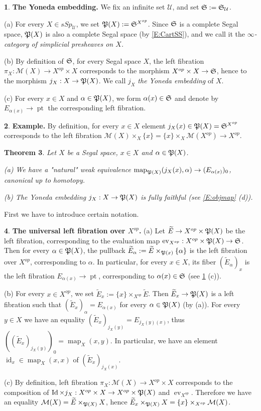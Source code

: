 \documentclass[12pt]{amsart}
\theoremstyle{plain}
\newtheorem{Thm}{Theorem}[subsection]
\theoremstyle{definition}
\newtheorem{Emp}[Thm]{}
\numberwithin{equation}{section}
\newcommand{\cal}[1]{\mathcal{#1}}
\newcommand{\C}[1]{\cal#1}
\newcommand{\wt}{\widetilde}
\newcommand{\al}{\alpha}
\newcommand{\re}[1]{\ref{E:#1}}
\newcommand{\id}{\operatorname{id}}
\newcommand{\ev}{\operatorname{ev}}
\newcommand{\map}{\operatorname{map}}
\newcommand{\pt}{\operatorname{pt}}
\newcommand{\Id}{\operatorname{Id}}
\renewcommand{\S}{\frak{S}}
\renewcommand{\P}{\frak{P}}
\begin{document}
\begin{Emp} \label{E:yoneda}
{\bf The Yoneda embedding.} We fix an infinite set $\C{U}$, and set
$\S:=\S_{\C{U}}$.

(a) For every $X\in sSp_{\C{U}}$, we set $\P(X):=\S^{X^{op}}$.
Since $\S$ is a complete Segal space, $\P(X)$ is also a complete
Segal space (by \re{CartSS}), and we call it the {\em
$\infty$-category of simplicial presheaves on $X$.}

(b) By definition of $\S$, for every Segal space $X$, the left
fibration $\pi_X:\C{M}(X)\to X^{op}\times X$ corresponds to the
morphism $X^{op}\times X\to \S$, hence to the morphism
$j_X:X\to\P(X)$. We call $j_X$ {\em the Yoneda embedding} of $X$.

(c) For every $x\in X$ and $\al\in\P(X)$, we form $\al(x)\in
\S$ and denote by $E_{\al(x)}\to\pt$ the corresponding left fibration.
\end{Emp}

\begin{Emp} \label{E:ex}
{\bf Example.} By definition, for every $x\in X$ element
$j_X(x)\in\P(X)=\S^{X^{op}}$ corresponds to the left fibration
$\C{M}(X)\times_X\{x\}=\{x\}\times_{X}\C{M}(X^{op})\to X^{op}$.
\end{Emp}

\begin{Thm} \label{T:yoneda}
Let $X$ be a Segal space, $x\in X$ and $\al\in\P(X)$.

(a) We have a "natural" weak equivalence
$\map_{\P(X)}(j_X(x),\al)\to (E_{\al(x)})_0$, canonical up to
homotopy.

(b) The Yoneda embedding $j_X:X\to\P(X)$ is fully faithful (see
\re{objmap} (d)).
\end{Thm}

First we have to introduce certain notation.

\begin{Emp} \label{E:wte}
{\bf The universal left fibration over $X^{op}$.} (a) Let
$\wt{E}\to X^{op}\times\P(X)$ be the left fibration, corresponding
to the evaluation map $\ev_{X^{op}}:X^{op}\times\P(X)\to \S$.
Then for every $\al\in\P(X)$, the pullback
$\wt{E}_{\al}:=\wt{E}\times_{\P(x)}\{\al\}$ is the left fibration
over $X^{op}$, corresponding to $\al$. In particular, for every
$x\in X$, its fiber $(\wt{E}_{\al})_x$ is the left fibration
$E_{\al(x)}\to\pt$, corresponding to $\al(x)\in \S$ (see
\re{yoneda} (c)).

(b) For every $x\in X^{op}$, we set
$\wt{E}_x:=\{x\}\times_{X^{op}}\wt{E}$. Then $\wt{E}_x\to\P(X)$ is
a left fibration such that $(\wt{E}_x)_{\al}=E_{\al(x)}$ for every
$\al\in\P(X)$ (by (a)). For every $y\in X$ we have an equality
$(\wt{E}_x)_{j_X(y)}=E_{j_X(y)(x)}$, thus
$((\wt{E}_x)_{j_X(y)})_0=\map_X(x,y)$. In particular, we have an
element $\id_x\in\map_X(x,x)$ of $(\wt{E}_x)_{j_X(x)}$.

(c) By definition, left fibration $\pi_X:\C{M}(X)\to X^{op}\times X$
corresponds to the composition of  $\Id\times j_X:X^{op}\times
X\to X^{op}\times\P(X)$ and $\ev_{X^{op}}$. Therefore we have an
equality $\C{M}(X)=\wt{E}\times_{\P(X)} X$, hence
$\wt{E}_x\times_{\P(X)}X=\{x\}\times_{X^{op}}\C{M}(X)$.
\end{Emp}
\end{document}
